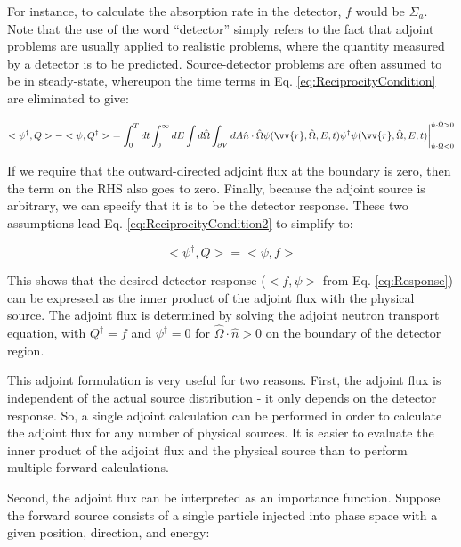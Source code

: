 \documentclass[10pt]{article}
\begin{document}
\begin{flushleft}
For instance, to calculate the absorption rate in the detector, \(f\) would be \(\Sigma_a\). Note that the use of the word ``detector'' simply refers to the fact that adjoint problems are usually applied to realistic problems, where the quantity measured by a detector is to be predicted. Source-detector problems are often assumed to be in steady-state, whereupon the time terms in Eq. \eqref{eq:ReciprocityCondition} are eliminated to give:

\begin{equation}
\label{eq:ReciprocityCondition2}
<\psi^\dagger,Q>-<\psi,Q^\dagger> \ = \int_0^{T}dt\int_0^\infty dE\int d\hat{\Omega}\int_{\partial V}dA\hat{n}\cdot\hat{\Omega}\psi(\vv{r},\hat{\Omega},E,t)\psi^\dagger\psi(\vv{r},\hat{\Omega},E,t)\biggr\rvert_{\hat{n}\cdot\hat{\Omega}<0}^{\hat{n}\cdot\hat{\Omega}>0}
\end{equation}

If we require that the outward-directed adjoint flux at the boundary is zero, then the term on the RHS also goes to zero. Finally, because the adjoint source is arbitrary, we can specify that it is to be the detector response. These two assumptions lead Eq. \eqref{eq:ReciprocityCondition2} to simplify to:

\begin{equation}
\label{eq:ReciprocityCondition3}
<\psi^\dagger,Q>=<\psi,f>
\end{equation}

This shows that the desired detector response (\(<f,\psi>\) from Eq. \eqref{eq:Response}) can be expressed as the inner product of the adjoint flux with the physical source. The adjoint flux is determined by solving the adjoint neutron transport equation, with \(Q^\dagger=f\) and \(\psi^\dagger=0\) for \(\hat{\Omega}\cdot\hat{n}>0\) on the boundary of the detector region. 

This adjoint formulation is very useful for two reasons. First, the adjoint flux is independent of the actual source distribution - it only depends on the detector response. So, a single adjoint calculation can be performed in order to calculate the adjoint flux for any number of physical sources. It is easier to evaluate the inner product of the adjoint flux and the physical source than to perform multiple forward calculations. 

Second, the adjoint flux can be interpreted as an importance function. Suppose the forward source consists of a single particle injected into phase space with a given position, direction, and energy:


\end{flushleft}
\end{document}
